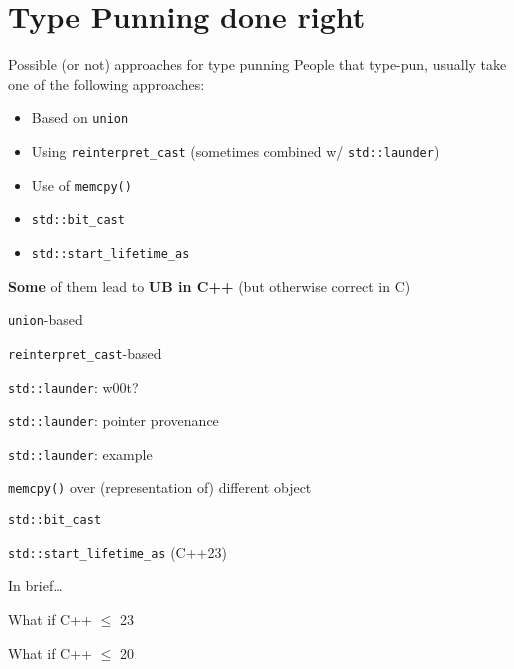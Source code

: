 \section{Type Punning done right}

\begin{frame}{Possible (or not) approaches for type punning}
  People that type-pun, usually take one of the following approaches:
  \vfill

  \begin{itemize}
  \item Based on \texttt{union}
  \item Using \texttt{reinterpret\_cast} (sometimes combined w/ \texttt{std::launder})
  \item Use of \texttt{memcpy()}
  \item \texttt{std::bit\_cast}
  \item \texttt{std::start\_lifetime\_as}
  \end{itemize}

  \vfill
  \pause
  \textbf{Some} of them lead to \textbf{UB in C++} (but otherwise correct in C)
\end{frame}

\begin{frame}{\texttt{union}-based}
\end{frame}

\begin{frame}{\texttt{reinterpret\_cast}-based}
\end{frame}

\begin{frame}{\texttt{std::launder}: w00t?}
\end{frame}

\begin{frame}{\texttt{std::launder}: pointer provenance}
\end{frame}

\begin{frame}{\texttt{std::launder}: example}
\end{frame}

\begin{frame}{\texttt{memcpy()} over (representation of) different object}
\end{frame}

\begin{frame}{\texttt{std::bit\_cast}}
\end{frame}

\begin{frame}{\texttt{std::start\_lifetime\_as} (C++23)}
\end{frame}

\begin{frame}{In brief\ldots}
\end{frame}

\begin{frame}{What if C++ $\leq$ 23}
\end{frame}

\begin{frame}{What if C++ $\leq$ 20}
\end{frame}
